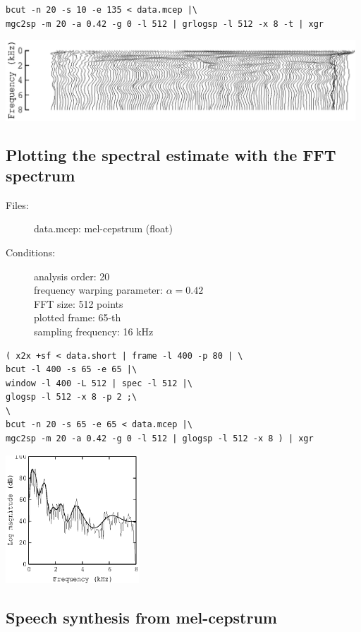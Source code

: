 \documentclass[a4paper,10pt]{article}
\begin{document}
\begin{verbatim}
bcut -n 20 -s 10 -e 135 < data.mcep |\
mgc2sp -m 20 -a 0.42 -g 0 -l 512 | grlogsp -l 512 -x 8 -t | xgr
\end{verbatim}

\includegraphics[height=3cm]{data.mcep.grlogsp-t.eps}

\subsection{Plotting the spectral estimate with the FFT spectrum}

\begin{description}
\item[Files:]
  data.mcep: mel-cepstrum (float)
\item[Conditions:]
  analysis order: 20\\
  frequency warping parameter: $\alpha = 0.42$\\
  FFT size: 512 points\\
  plotted frame: 65-th\\
  sampling frequency: 16 kHz
\end{description}

\begin{verbatim}
( x2x +sf < data.short | frame -l 400 -p 80 | \
bcut -l 400 -s 65 -e 65 |\
window -l 400 -L 512 | spec -l 512 |\
glogsp -l 512 -x 8 -p 2 ;\
\
bcut -n 20 -s 65 -e 65 < data.mcep |\
mgc2sp -m 20 -a 0.42 -g 0 -l 512 | glogsp -l 512 -x 8 ) | xgr
\end{verbatim}

\includegraphics[width=5cm]{data.mcep.glogsp.eps}

\subsection{Speech synthesis from mel-cepstrum}
\end{document}
